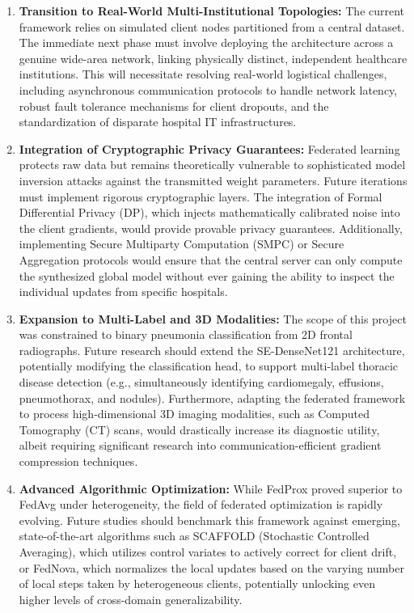 \documentclass[12pt,a4paper]{report}
\begin{document}
\begin{enumerate}
    \item \textbf{Transition to Real-World Multi-Institutional Topologies:} The current framework relies on simulated client nodes partitioned from a central dataset. The immediate next phase must involve deploying the architecture across a genuine wide-area network, linking physically distinct, independent healthcare institutions. This will necessitate resolving real-world logistical challenges, including asynchronous communication protocols to handle network latency, robust fault tolerance mechanisms for client dropouts, and the standardization of disparate hospital IT infrastructures.

    \item \textbf{Integration of Cryptographic Privacy Guarantees:} Federated learning protects raw data but remains theoretically vulnerable to sophisticated model inversion attacks against the transmitted weight parameters. Future iterations must implement rigorous cryptographic layers. The integration of Formal Differential Privacy (DP), which injects mathematically calibrated noise into the client gradients, would provide provable privacy guarantees. Additionally, implementing Secure Multiparty Computation (SMPC) or Secure Aggregation protocols would ensure that the central server can only compute the synthesized global model without ever gaining the ability to inspect the individual updates from specific hospitals.

    \item \textbf{Expansion to Multi-Label and 3D Modalities:} The scope of this project was constrained to binary pneumonia classification from 2D frontal radiographs. Future research should extend the SE-DenseNet121 architecture, potentially modifying the classification head, to support multi-label thoracic disease detection (e.g., simultaneously identifying cardiomegaly, effusions, pneumothorax, and nodules). Furthermore, adapting the federated framework to process high-dimensional 3D imaging modalities, such as Computed Tomography (CT) scans, would drastically increase its diagnostic utility, albeit requiring significant research into communication-efficient gradient compression techniques.

    \item \textbf{Advanced Algorithmic Optimization:} While FedProx proved superior to FedAvg under heterogeneity, the field of federated optimization is rapidly evolving. Future studies should benchmark this framework against emerging, state-of-the-art algorithms such as SCAFFOLD (Stochastic Controlled Averaging), which utilizes control variates to actively correct for client drift, or FedNova, which normalizes the local updates based on the varying number of local steps taken by heterogeneous clients, potentially unlocking even higher levels of cross-domain generalizability.
\end{enumerate}
\end{document}

